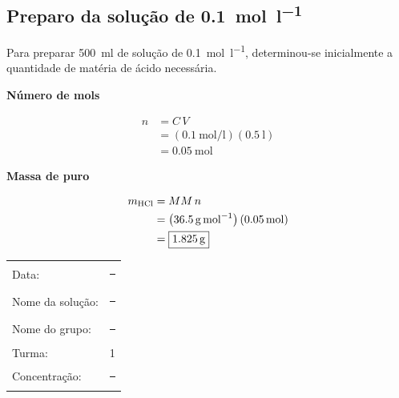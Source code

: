 \documentclass[a4paper,12pt]{article}
\newcommand{\subtitulo}[1]{%
  \par\medskip
  {\color{quadroazul}\bfseries\large #1}\par\smallskip
}
\begin{document}
\subsection{Preparo da solução de  \qty{0.1}{\mole\per\litre}}

Para preparar \qty{500}{\milli\litre} de solução de 
\qty{0.1}{\mole\per\litre}, determinou-se inicialmente a quantidade de matéria de ácido necessária.

\begin{minipage}[t]{0.48\textwidth}
\subtitulo{Número de mols}

\begin{align*}
  n &= C\,V \\
    &= \left(\qty{0.1}{\mole\per\litre}\right)
       \left(\qty{0.5}{\litre}\right) \\
    &= \boxed{\qty{0.05}{\mole}}
\end{align*}

\subtitulo{Massa de  puro}

\begin{align*}
  m_{\ce{HCl}} &= MM\,n \\
    &= \left(\qty{36.5}{\gram\per\mole}\right)
       \left(\qty{0.05}{\mole}\right) \\
    &= \boxed{\qty{1.825}{\gram}}
\end{align*}

\begin{tcolorbox}[
  title=Etiqueta da solução,
  colback=quadrocinza,
  colframe=black!65,
  boxrule=0.6pt,
  arc=1mm
]
\begin{tabular}{@{}ll@{}}
Data: & \rule{3.0cm}{0.4pt}\\[1.3ex]
Nome da solução: & \rule{2.2cm}{0.4pt}\\[1.3ex]
Nome do grupo: & \rule{2.5cm}{0.4pt}\\[1.3ex]
Turma: & 1\\[1.3ex]
Concentração: & \rule{2.8cm}{0.4pt}
\end{tabular}
\end{tcolorbox}
\end{minipage}
\hfill
\end{document}
